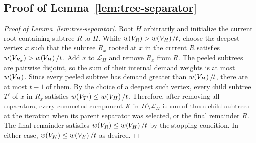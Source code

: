 \subsection{Proof of Lemma~\ref{lem:tree-separator}}\label{app:tree-separator}
\begin{proof}[Proof of Lemma~\ref{lem:tree-separator}]
    Root $H$ arbitrarily and initialize the current root-containing subtree $R$ to $H$. While $w\mathopen{}\left( V_R \right)>w\mathopen{}\left( V_H \right)/t$, choose the deepest vertex $x$ such that the subtree $R_x$ rooted at $x$ in the current $R$ satisfies $w\mathopen{}\left( V_{R_x} \right)>w\mathopen{}\left( V_H \right)/t$.
    Add $x$ to $\mathcal L_H$ and remove $R_x$ from $R$. The peeled subtrees are pairwise disjoint, so the sum of their internal demand weights is at most $w\mathopen{}\left( V_H \right)$. Since every peeled subtree has demand greater than $w\mathopen{}\left( V_H \right)/t$, there are at most $t-1$ of them. By the choice of a deepest such vertex, every child subtree $T'$ of $x$ in $R_x$ satisfies $w\mathopen{}\left( V_{T'} \right)\leq w\mathopen{}\left( V_H \right)/t$. Therefore, after removing all separators, every connected component $K$ in $H\setminus\mathcal L_H$ is one of these child subtrees at the iteration when its parent separator was selected, or the final remainder $R$. The final remainder satisfies $w\mathopen{}\left( V_R \right)\leq w\mathopen{}\left( V_H \right)/t$ by the stopping condition. In either case, $w\mathopen{}\left( V_K \right)\leq w\mathopen{}\left( V_H \right)/t$ as desired.
\end{proof}

